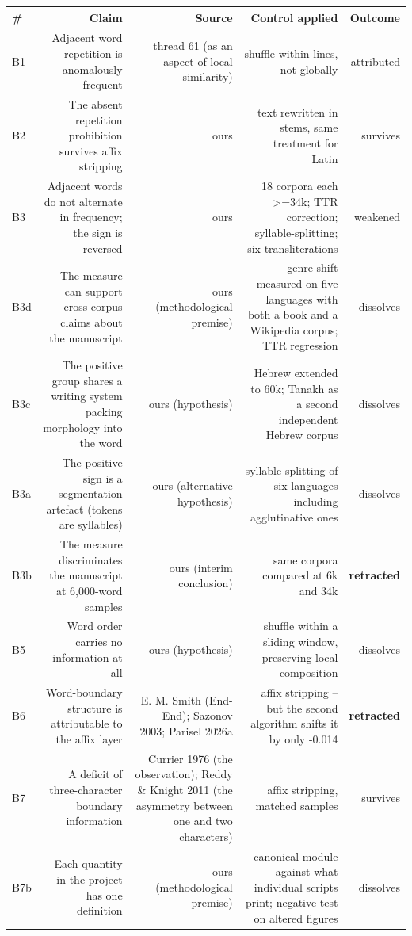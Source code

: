 \documentclass[11pt,a4paper]{article}
\begin{document}
\begin{table}[htbp]\centering\small
\begin{tabular}{@{}lrrrr@{}}
\toprule
\# & Claim & Source & Control applied & Outcome \\
\midrule
B1 & Adjacent word repetition is anomalously frequent & thread 61 (as an aspect of local similarity) & shuffle within lines, not globally & attributed \\
B2 & The absent repetition prohibition survives affix stripping & ours & text rewritten in stems, same treatment for Latin & survives \\
B3 & Adjacent words do not alternate in frequency; the sign is reversed & ours & 18 corpora each >=34k; TTR correction; syllable-splitting; six transliterations & weakened \\
B3d & The measure can support cross-corpus claims about the manuscript & ours (methodological premise) & genre shift measured on five languages with both a book and a Wikipedia corpus; TTR regression & dissolves \\
B3c & The positive group shares a writing system packing morphology into the word & ours (hypothesis) & Hebrew extended to 60k; Tanakh as a second independent Hebrew corpus & dissolves \\
B3a & The positive sign is a segmentation artefact (tokens are syllables) & ours (alternative hypothesis) & syllable-splitting of six languages including agglutinative ones & dissolves \\
B3b & The measure discriminates the manuscript at 6,000-word samples & ours (interim conclusion) & same corpora compared at 6k and 34k & \textbf{retracted} \\
B5 & Word order carries no information at all & ours (hypothesis) & shuffle within a sliding window, preserving local composition & dissolves \\
B6 & Word-boundary structure is attributable to the affix layer & E. M. Smith (End-End); Sazonov 2003; Parisel 2026a & affix stripping -- but the second algorithm shifts it by only -0.014 & \textbf{retracted} \\
B7 & A deficit of three-character boundary information & Currier 1976 (the observation); Reddy \& Knight 2011 (the asymmetry between one and two characters) & affix stripping, matched samples & survives \\
B7b & Each quantity in the project has one definition & ours (methodological premise) & canonical module against what individual scripts print; negative test on altered figures & dissolves \\

\end{tabular}
\end{table}
\end{document}
